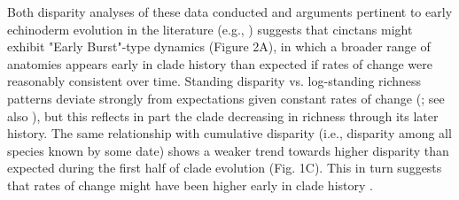 \documentclass{article}
\begin{document}
Both disparity analyses of these data conducted and arguments pertinent to early echinoderm evolution in the literature (e.g., \citealp{SmithEtAl2013}) suggests that cinctans might exhibit "Early Burst"-type dynamics (Figure 2A), in which a broader range of anatomies appears early in clade history than expected if rates of change were reasonably consistent over time.  Standing disparity vs. log-standing richness patterns deviate strongly from expectations given constant rates of change (\citealp{Jablonski2020}; see also \citealp{Wright2017}), but this reflects in part the clade decreasing in richness through its later history.  The same relationship with cumulative disparity (i.e., disparity among all species known by some date) shows a weaker trend towards higher disparity than expected during the first half of clade evolution (Fig. 1C).  This in turn suggests that rates of change might have been higher early in clade history \citep{Foote1996b}. 
\end{document}
